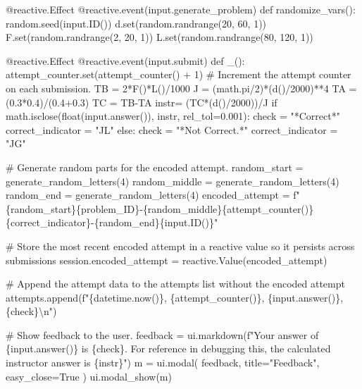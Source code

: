 \documentclass[
  letterpaper,
  DIV=11,
  numbers=noendperiod]{scrreprt}
\newenvironment{Shaded}{\begin{snugshade}}{\end{snugshade}}
\newcommand{\NormalTok}[1]{\textcolor[rgb]{0.00,0.23,0.31}{#1}}
\begin{document}
\begin{Shaded}
\begin{Highlighting}[]
\NormalTok{    @reactive.Effect}
\NormalTok{    @reactive.event(input.generate\_problem)}
\NormalTok{    def randomize\_vars():}
\NormalTok{        random.seed(input.ID())}
\NormalTok{        d.set(random.randrange(20, 60, 1))}
\NormalTok{        F.set(random.randrange(2, 20, 1))}
\NormalTok{        L.set(random.randrange(80, 120, 1))}
        
        
\NormalTok{    @reactive.Effect}
\NormalTok{    @reactive.event(input.submit)}
\NormalTok{    def \_():}
\NormalTok{        attempt\_counter.set(attempt\_counter() + 1)  \# Increment the attempt counter on each submission.}
\NormalTok{        TB = 2*F()*L()/1000}
\NormalTok{        J = (math.pi/2)*(d()/2000)**4}
\NormalTok{        TA = (0.3*0.4)/(0.4+0.3)}
\NormalTok{        TC = TB{-}TA}
\NormalTok{        instr= (TC*(d()/2000))/J}
\NormalTok{        if math.isclose(float(input.answer()), instr, rel\_tol=0.001):}
\NormalTok{            check = "*Correct*"}
\NormalTok{            correct\_indicator = "JL"}
\NormalTok{        else:}
\NormalTok{            check = "*Not Correct.*"}
\NormalTok{            correct\_indicator = "JG"}

\NormalTok{        \# Generate random parts for the encoded attempt.}
\NormalTok{        random\_start = generate\_random\_letters(4)}
\NormalTok{        random\_middle = generate\_random\_letters(4)}
\NormalTok{        random\_end = generate\_random\_letters(4)}
\NormalTok{        encoded\_attempt = f"\{random\_start\}\{problem\_ID\}{-}\{random\_middle\}\{attempt\_counter()\}\{correct\_indicator\}{-}\{random\_end\}\{input.ID()\}"}

\NormalTok{        \# Store the most recent encoded attempt in a reactive value so it persists across submissions}
\NormalTok{        session.encoded\_attempt = reactive.Value(encoded\_attempt)}

\NormalTok{        \# Append the attempt data to the attempts list without the encoded attempt}
\NormalTok{        attempts.append(f"\{datetime.now()\}, \{attempt\_counter()\}, \{input.answer()\}, \{check\}\textbackslash{}n")}

\NormalTok{        \# Show feedback to the user.}
\NormalTok{        feedback = ui.markdown(f"Your answer of \{input.answer()\} is \{check\}. For reference in debugging this, the calculated instructor answer is \{instr\}")}
\NormalTok{        m = ui.modal(}
\NormalTok{            feedback,}
\NormalTok{            title="Feedback",}
\NormalTok{            easy\_close=True}
\NormalTok{        )}
\NormalTok{        ui.modal\_show(m)}


\end{Highlighting}
\end{Shaded}
\end{document}
